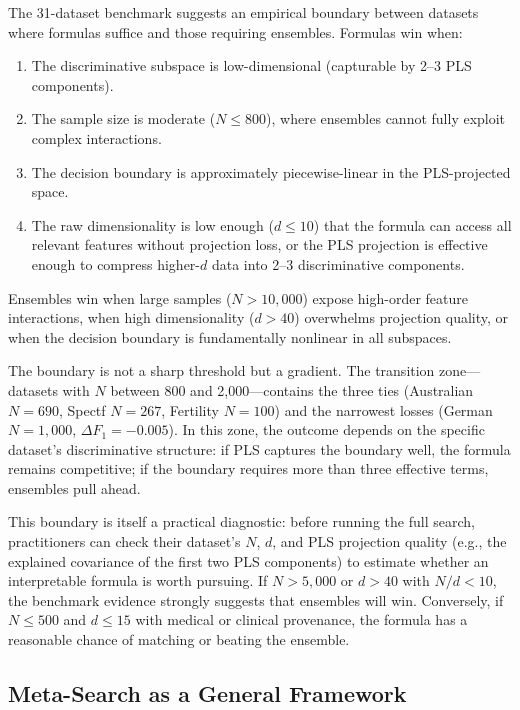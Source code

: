 \documentclass[journal]{IEEEtran}
\begin{document}
The 31-dataset benchmark suggests an empirical boundary between
datasets where formulas suffice and those requiring ensembles.
Formulas win when:
\begin{enumerate}
\item The discriminative subspace is low-dimensional (capturable by
2--3 PLS components).
\item The sample size is moderate ($N \leq 800$), where ensembles
cannot fully exploit complex interactions.
\item The decision boundary is approximately piecewise-linear in the
PLS-projected space.
\item The raw dimensionality is low enough ($d \leq 10$) that the
formula can access all relevant features without projection loss,
or the PLS projection is effective enough to compress higher-$d$
data into 2--3 discriminative components.
\end{enumerate}
Ensembles win when large samples ($N > 10{,}000$) expose high-order
feature interactions, when high dimensionality ($d > 40$) overwhelms
projection quality, or when the decision boundary is fundamentally
nonlinear in all subspaces.

The boundary is not a sharp threshold but a gradient.  The transition
zone---datasets with $N$ between 800 and 2{,}000---contains the
three ties (Australian $N = 690$, Spectf $N = 267$, Fertility
$N = 100$) and the narrowest losses (German $N = 1{,}000$,
$\Delta F_1 = -0.005$).  In this zone, the outcome depends on the
specific dataset's discriminative structure: if PLS captures the
boundary well, the formula remains competitive; if the boundary
requires more than three effective terms, ensembles pull ahead.

This boundary is itself a practical diagnostic: before running the
full search, practitioners can check their dataset's $N$, $d$, and
PLS projection quality (e.g., the explained covariance of the first
two PLS components) to estimate whether an interpretable formula is
worth pursuing.  If $N > 5{,}000$ or $d > 40$ with $N/d < 10$, the
benchmark evidence strongly suggests that ensembles will win.
Conversely, if $N \leq 500$ and $d \leq 15$ with medical or
clinical provenance, the formula has a reasonable chance of matching
or beating the ensemble.

\subsection{Meta-Search as a General Framework}
\label{sec:meta-general}
\end{document}
